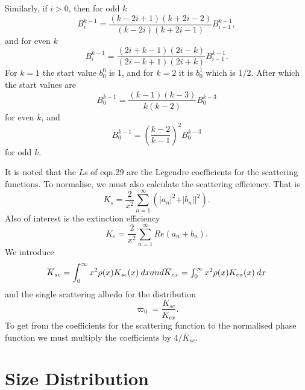 \documentclass[12pt]{article}
\begin{document}
Similarly, if $i>0$, then for odd $k$
\begin{equation}
B^{k-1}_i=\frac{(k-2i+1)(k+2i-2)}{(k-2i)(k+2i-1)}B^{k-1}_{i-1},
\end{equation} 
and for even $k$
\begin{equation}
B^{k-1}_i=\frac{(2i+k-1)(2i-k)}{(2i-k+1)(2i+k)}B^{k-1}_{i-1}.
\end{equation} 
For $k=1$ the start value $b^0_0$ is 1, and for $k=2$ it is $b^1_0$ which is 1/2.
After which the start values are
\begin{equation}
B^{k-1}_0= \frac{(k-1)(k-3)}{k(k-2)} B^{k-3}_0
\end{equation}
 for even $k$, and
\begin{equation}
B^{k-1}_0= \left (\frac{k-2}{k-1} \right )^2 B^{k-3}_0
\end{equation}
 for odd $k$.

It is noted that the $L$s of eqn.29 are the Legendre coefficients 
for the scattering functions.
To normalise, we must also calculate the scattering efficiency. That is
\begin{equation}
K_s=\frac{2}{x^2}\sum_{n=1}^\infty (\vert a_n \vert^2  +\vert b_n \vert|^ 2).
\end{equation}
Also of interest is the extinction efficiency
\begin{equation}
K_e=\frac{2}{x^2}\sum_{n=1}^\infty Re( a_n+b_n).
\end{equation}
We introduce
\begin{equation}
{\overline K_{sc}}=\int_0^\infty x^2 \rho(x) K_{sc}(x) \> dx
$$   and $$
{\overline K_{ex}}=\int_0^\infty x^2 \rho(x) K_{ex}(x) \> dx
\end{equation}
and the single scattering albedo for the distribution
\begin{equation}
\varpi_0=\frac{K_{sc}}{K_{ex}}.
\end{equation}
To get from the coefficients for the scattering function to the normalised phase 
function we must multiply the coefficients by $4/{\overline K_{sc}}$.

\section{Size Distribution}
\end{document}
